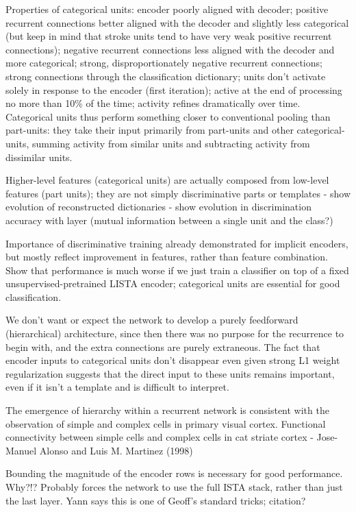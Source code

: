 Properties of categorical units: encoder poorly aligned with decoder; positive recurrent connections better aligned with the decoder and slightly less categorical (but keep in mind that stroke units tend to have very weak positive recurrent connections); negative recurrent connections less aligned with the decoder and more categorical; strong, disproportionately negative recurrent connections; strong connections through the classification dictionary; units don't activate solely in response to the encoder (first iteration); active at the end of processing no more than 10\% of the time; activity refines dramatically over time.  Categorical units thus perform something closer to conventional pooling than part-units: they take their input primarily from part-units and other categorical-units, summing activity from similar units and subtracting activity from dissimilar units.  

Higher-level features (categorical units) are actually composed from low-level features (part units); they are not simply discriminative parts or templates
  - show evolution of reconstructed dictionaries
  - show evolution in discrimination accuracy with layer (mutual information between a single unit and the class?)

Importance of discriminative training already demonstrated for implicit encoders, but mostly reflect improvement in features, rather than feature combination.  Show that performance is much worse if we just train a classifier on top of a fixed unsupervised-pretrained LISTA encoder; categorical units are essential for good classification.  
 
We don't want or expect the network to develop a purely feedforward (hierarchical) architecture, since then there was no purpose for the recurrence to begin with, and the extra connections are purely extraneous.  The fact that encoder inputs to categorical units don't disappear even given strong L1 weight regularization suggests that the direct input to these units remains important, even if it isn't a template and is difficult to interpret.


The emergence of hierarchy within a recurrent network is consistent with the observation of simple and complex cells in primary visual cortex.  
Functional connectivity between simple cells and complex cells in cat striate cortex - Jose-Manuel Alonso and Luis M. Martinez (1998)

Bounding the magnitude of the encoder rows is necessary for good performance.  Why?!?  Probably forces the network to use the full ISTA stack, rather than just the last layer.  Yann says this is one of Geoff's standard tricks; citation?

